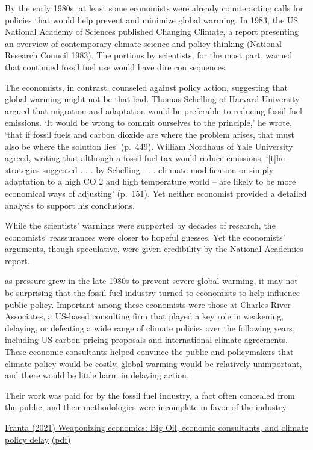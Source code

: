 \documentclass[
]{book}
\begin{document}
By the early 1980s, at least some economists were already counteracting
calls for policies that would help prevent and minimize global warming. In
1983, the US National Academy of Sciences published Changing Climate,
a report presenting an overview of contemporary climate science and policy
thinking (National Research Council 1983). The portions by scientists, for
the most part, warned that continued fossil fuel use would have dire con­
sequences.

The economists, in contrast, counseled against policy action, suggesting
that global warming might not be that bad. Thomas Schelling of Harvard
University argued that migration and adaptation would be preferable to
reducing fossil fuel emissions. `It would be wrong to commit ourselves to
the principle,' he wrote, `that if fossil fuels and carbon dioxide are where the
problem arises, that must also be where the solution lies' (p.~449). William
Nordhaus of Yale University agreed, writing that although a fossil fuel tax
would reduce emissions, `{[}t{]}he strategies suggested . . . by Schelling . . . cli­
mate modification or simply adaptation to a high CO 2 and high temperature
world -- are likely to be more economical ways of adjusting' (p.~151). Yet
neither economist provided a detailed analysis to support his conclusions.

While the scientists' warnings were supported by decades of research, the
economists' reassurances were closer to hopeful guesses.
Yet the
economists' arguments, though speculative, were given credibility by the
National Academies report.

as pressure grew in the late 1980s to prevent severe global warming,
it may not be surprising that the fossil fuel industry turned to economists to
help influence public policy. Important among these economists were those
at Charles River Associates, a US-based consulting firm that played a key role
in weakening, delaying, or defeating a wide range of climate policies over the
following years, including US carbon pricing proposals and international
climate agreements. These economic consultants helped convince the public
and policymakers that climate policy would be costly, global warming would
be relatively unimportant, and there would be little harm in delaying action.

Their work was paid for by the fossil fuel industry, a fact often concealed
from the public, and their methodologies were incomplete in favor of the
industry.

\href{https://www.tandfonline.com/doi/full/10.1080/09644016.2021.1947636}{Franta (2021) Weaponizing economics: Big Oil, economic consultants,
and climate policy delay}
\href{pdf/Franta_2021_Weaponizing_Economics.pdf}{(pdf)}
\end{document}
